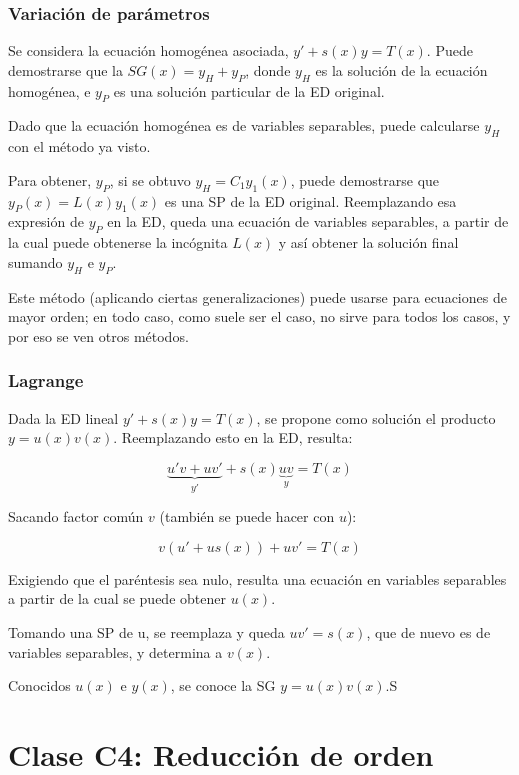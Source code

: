 \documentclass{article}
\begin{document}
\subsubsection{Variación de parámetros}

Se considera la ecuación homogénea asociada, $y' + s(x) y = T(x)$. Puede demostrarse que la $SG(x) = y_H + y_P$, donde $y_H$ es la solución de la ecuación homogénea, e $y_P$ es una solución particular de la ED original.

Dado que la ecuación homogénea es de variables separables, puede calcularse $y_H$ con el método ya visto.

Para obtener, $y_P$, si se obtuvo $y_H = C_1 y_1(x)$, puede demostrarse que $y_P(x) = L(x) y_1(x)$ es una SP de la ED original. Reemplazando esa expresión de $y_P$ en la ED, queda una ecuación de variables separables, a partir de la cual puede obtenerse la incógnita $L(x)$ y así obtener la solución final sumando $y_H$ e $y_P$.

Este método (aplicando ciertas generalizaciones) puede usarse para ecuaciones de mayor orden; en todo caso, como suele ser el caso, no sirve para todos los casos, y por eso se ven otros métodos.

\subsubsection{Lagrange}

Dada la ED lineal $y' + s(x) y = T(x)$, se propone como solución el producto $y = u(x) v(x)$. Reemplazando esto en la ED, resulta:

\begin{equation}
\underbrace{u'v + uv'}_{y'} + s(x) \underbrace{uv}_{y} = T(x)
\end{equation}

Sacando factor común $v$ (también se puede hacer con $u$):

\begin{equation}
v (u' + u s(x)) + uv' = T(x)
\end{equation}

Exigiendo que el paréntesis sea nulo, resulta una ecuación en variables separables a partir de la cual se puede obtener $u(x)$.

Tomando una SP de u, se reemplaza y queda $uv' = s(x)$, que de nuevo es de variables separables, y determina a $v(x)$.

Conocidos $u(x)$ e $y(x)$, se conoce la SG $y = u(x) v(x)$.S

\section{Clase C4: Reducción de orden}
\end{document}
